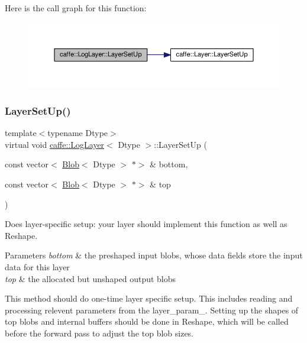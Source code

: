 Here is the call graph for this function\+:
\nopagebreak
\begin{figure}[H]
\begin{center}
\leavevmode
\includegraphics[width=350pt]{classcaffe_1_1_log_layer_a87e062000908b474ac4cda3b2f3c6f1e_cgraph}
\end{center}
\end{figure}
\mbox{\label{classcaffe_1_1_log_layer_aa73d4cdfc38059902ffa2258d58e1dd4}} 
\subsubsection{\texorpdfstring{Layer\+Set\+Up()}{LayerSetUp()}\hspace{0.1cm}{\footnotesize\ttfamily [2/2]}}
{\footnotesize\ttfamily template$<$typename Dtype$>$ \\
virtual void \mbox{\hyperlink{classcaffe_1_1_log_layer}{caffe\+::\+Log\+Layer}}$<$ Dtype $>$\+::Layer\+Set\+Up (\begin{DoxyParamCaption}\item[{const vector$<$ \mbox{\hyperlink{classcaffe_1_1_blob}{Blob}}$<$ Dtype $>$ $\ast$$>$ \&}]{bottom,  }\item[{const vector$<$ \mbox{\hyperlink{classcaffe_1_1_blob}{Blob}}$<$ Dtype $>$ $\ast$$>$ \&}]{top }\end{DoxyParamCaption})\hspace{0.3cm}{\ttfamily [virtual]}}



Does layer-\/specific setup\+: your layer should implement this function as well as Reshape. 


\begin{DoxyParams}{Parameters}
{\em bottom} & the preshaped input blobs, whose data fields store the input data for this layer \\
\hline
{\em top} & the allocated but unshaped output blobs\\
\hline
\end{DoxyParams}
This method should do one-\/time layer specific setup. This includes reading and processing relevent parameters from the {\ttfamily layer\+\_\+param\+\_\+}. Setting up the shapes of top blobs and internal buffers should be done in {\ttfamily Reshape}, which will be called before the forward pass to adjust the top blob sizes. 

